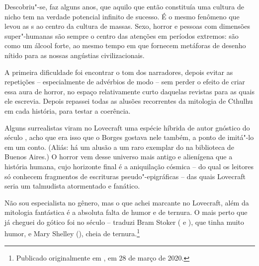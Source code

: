 \begin{changemargin}
Descobriu"-se, faz alguns anos, que aquilo que então constituía uma cultura de nicho tem na verdade potencial infinito de sucesso. É o mesmo fenômeno que levou as s ao centro da cultura de massas. Sexo, horror e pessoas com dimensões super"-humanas são sempre o centro das atenções em períodos extremos: são como um álcool forte, ao mesmo tempo em que fornecem metáforas de desenho nítido para as nossas angústias civilizacionais. 

\bigskip
\bigskip


\bigskip


A primeira dificuldade foi encontrar o tom dos narradores, depois evitar as repetições – especialmente de advérbios de modo – sem perder o efeito de criar essa aura de horror, no espaço relativamente curto daquelas revistas para as quais ele escrevia. Depois repassei todas as alusões recorrentes da mitologia de Cthulhu em cada história, para testar a coerência.

\bigskip


Alguns surrealistas viram no Lovecraft uma espécie híbrida de autor gnóstico do século , acho que era isso que o Borges gostava nele também, a ponto de imitá"-lo em um conto. (Aliás: há um alusão a um raro exemplar do {} na biblioteca de Buenos Aires.) O horror vem desse universo mais antigo e alienígena que a história humana, cujo horizonte final é a aniquilação cósmica – do qual os leitores só conhecem fragmentos de escrituras pseudo"-epigráficas – das quais Lovecraft seria um talmudista atormentado e fanático.

\bigskip


Não sou especialista no gênero, mas o que achei marcante no Lovecraft, além da mitologia fantástica é a absoluta falta de humor e de ternura. O mais perto que já cheguei do gótico foi no século  – traduzi Bram Stoker ({} e {}), que tinha muito humor, e Mary Shelley ({}), cheia de ternura.\footnote{Publicado originalmente em {}, em 28 de março de 2020.}

\pagebreak

\end{changemargin}

